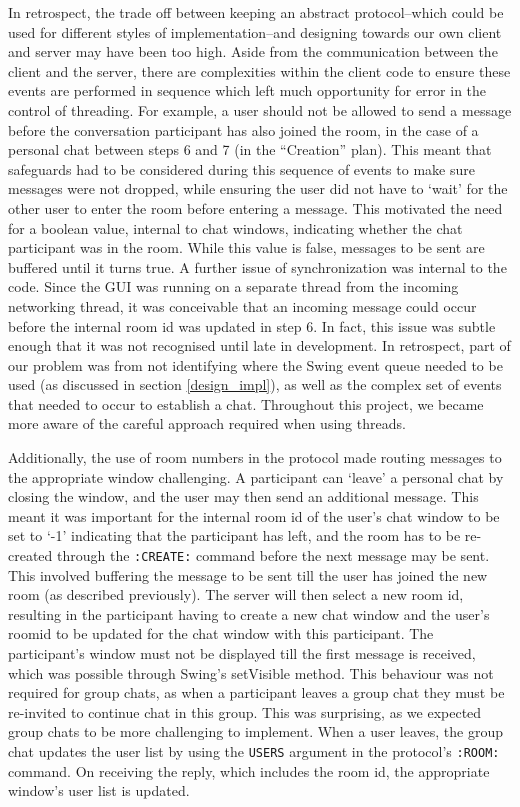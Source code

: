 In retrospect, the trade off between keeping an abstract protocol--which could be used for different styles of implementation--and designing towards our own client and server may have been too high. Aside from the communication between the client and the server, there are complexities within the client code to ensure these events are performed in sequence which left much opportunity for error in the control of threading. For example, a user should not be allowed to send a message before the conversation participant has also joined the room, in the case of a personal chat between steps 6 and 7 (in the ``Creation'' plan). This meant that safeguards had to be considered during this sequence of events to make sure messages were not dropped, while ensuring the user did not have to `wait' for the other user to enter the room before entering a message. This motivated the need for a boolean value, internal to chat windows, indicating whether the chat participant was in the room. While this value is false, messages to be sent are buffered until it turns true. A further issue of synchronization was internal to the code. Since the GUI was running on a separate thread from the incoming networking thread, it was conceivable that an incoming message could occur before the internal room id was updated in step 6. In fact, this issue was subtle enough that it was not recognised until late in development. In retrospect, part of our problem was from not identifying where the Swing event queue needed to be used (as discussed in section \ref{design_impl}), as well as the complex set of events that needed to occur to establish a chat. Throughout this project, we became more aware of the careful approach required when using threads. 

Additionally, the use of room numbers in the protocol made routing messages to the appropriate window challenging. A participant can `leave' a personal chat by closing the window, and the user may then send an additional message. This meant it was important for the internal room id of the user's chat window to be set to `-1' indicating that the participant has left, and the room has to be re-created through the \texttt{:CREATE:} command before the next message may be sent. This involved buffering the message to be sent till the user has joined the new room (as described previously). The server will then select a new room id, resulting in the participant having to create a new chat window and the user's roomid to be updated for the chat window with this participant. The participant's window must not be displayed till the first message is received, which was possible through Swing's setVisible method. This behaviour was not required for group chats, as when a participant leaves a group chat they must be re-invited to continue chat in this group. This was surprising, as we expected group chats to be more challenging to implement. When a user leaves, the group chat updates the user list by using the \texttt{USERS} argument in the protocol's \texttt{:ROOM:} command. On receiving the reply, which includes the room id, the appropriate window's user list is updated.

